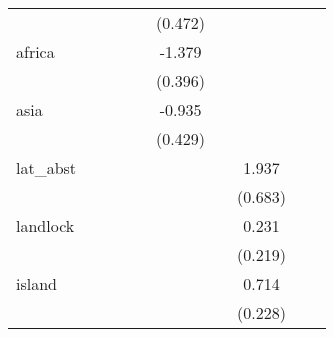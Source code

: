 {\begin{tabular}{l*{9}{c}}
            &                     &                     &                     &                     &     (0.472)         &                     &                     &                     &                     \\
[1em]
africa      &                     &                     &                     &                     &      -1.379\sym{***}&                     &                     &                     &                     \\
            &                     &                     &                     &                     &     (0.396)         &                     &                     &                     &                     \\
[1em]
asia        &                     &                     &                     &                     &      -0.935\sym{**} &                     &                     &                     &                     \\
            &                     &                     &                     &                     &     (0.429)         &                     &                     &                     &                     \\
[1em]
lat\_abst    &                     &                     &                     &                     &                     &                     &       1.937\sym{***}&                     &                     \\
            &                     &                     &                     &                     &                     &                     &     (0.683)         &                     &                     \\
[1em]
landlock    &                     &                     &                     &                     &                     &                     &       0.231         &                     &                     \\
            &                     &                     &                     &                     &                     &                     &     (0.219)         &                     &                     \\
[1em]
island      &                     &                     &                     &                     &                     &                     &       0.714\sym{***}&                     &                     \\
            &                     &                     &                     &                     &                     &                     &     (0.228)         &                     &                     \\

\end{tabular}}
